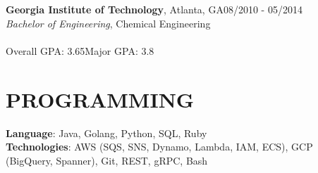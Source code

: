 \documentclass[margin,11pt]{res}
\begin{document}
\begin{resume}
\textbf{Georgia Institute of Technology}, Atlanta, GA\hfill 08/2010 - 05/2014\\
{\sl Bachelor of Engineering}, Chemical Engineering\\
\\
Overall GPA: 3.65\hspace{10mm}Major GPA: 3.8

\section{PROGRAMMING}

\textbf{Language}: Java, Golang, Python, SQL, Ruby\\
\textbf{Technologies}: AWS (SQS, SNS, Dynamo, Lambda, IAM, ECS), GCP (BigQuery, Spanner), Git, REST, gRPC, Bash\\

\end{resume}
\end{document}
